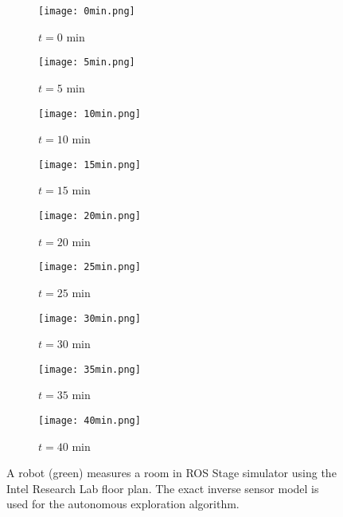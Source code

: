 \begin{figure}[!ht]
    \centering
    \begin{subfigure}[t]{0.3\columnwidth}
        \centering
        \texttt{[image: 0min.png]}
        \caption{$t=0$ min}
        \label{fig:IRL0min}
    \end{subfigure}
    \begin{subfigure}[t]{0.3\columnwidth}
        \centering
        \texttt{[image: 5min.png]}
        \caption{$t=5$ min}
        \label{fig:IRL5min}
    \end{subfigure}
    \begin{subfigure}[t]{0.3\columnwidth}
           \centering
           \texttt{[image: 10min.png]}
        \caption{$t=10$ min}
        \label{fig:IRL10min}
    \end{subfigure}
    \begin{subfigure}[t]{0.3\columnwidth}
           \centering
           \texttt{[image: 15min.png]}
        \caption{$t=15$ min}
        \label{fig:IRL15min}
    \end{subfigure}
    \begin{subfigure}[t]{0.3\columnwidth}
         \centering
         \texttt{[image: 20min.png]}
        \caption{$t=20$ min}
        \label{fig:IRL20min}
    \end{subfigure}
    \begin{subfigure}[t]{0.3\columnwidth}
           \centering
           \texttt{[image: 25min.png]}
        \caption{$t=25$ min}
        \label{fig:IRL25min}
    \end{subfigure}
    \begin{subfigure}[t]{0.3\columnwidth}
           \centering
           \texttt{[image: 30min.png]}
        \caption{$t=30$ min}
        \label{fig:IRL30min}
    \end{subfigure}
    \begin{subfigure}[t]{0.3\columnwidth}
           \centering
           \texttt{[image: 35min.png]}
        \caption{$t=35$ min}
        \label{fig:IRL35min}
    \end{subfigure}
    \begin{subfigure}[t]{0.3\columnwidth}
           \centering
           \texttt{[image: 40min.png]}
        \caption{$t=40$ min}
        \label{fig:IRL40min}
    \end{subfigure}
    \caption{A robot (green) measures a room in ROS Stage simulator using the Intel Research Lab floor plan. The exact inverse sensor model is used for the autonomous exploration algorithm.}
    \label{fig:IRL}
\end{figure}



